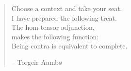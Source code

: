 
\vspace*{5cm}

\begin{verse}
    \hspace{2em}Choose a context and take your seat. \\
    \hspace{2em}I have prepared the following treat. \\
    \hspace{2em}The hom-tensor adjunction, \\
    \hspace{2em}makes the following function: \\
    \hspace{2em}Being contra is equivalent to complete. 

    \hspace{\fill}-- Torgeir Aambø
\end{verse}